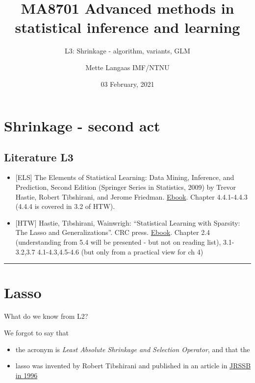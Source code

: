\documentclass[
]{article}
\title{MA8701 Advanced methods in statistical inference and learning}
\subtitle{L3: Shrinkage - algorithm, variants, GLM}
\author{Mette Langaas IMF/NTNU}
\date{03 February, 2021}
\providecommand{\tightlist}{%
  \setlength{\itemsep}{0pt}\setlength{\parskip}{0pt}}
\begin{document}
\maketitle

{
\setcounter{tocdepth}{2}
\tableofcontents
}
\hypertarget{shrinkage---second-act}{%
\section{Shrinkage - second act}\label{shrinkage---second-act}}

\hypertarget{literature-l3}{%
\subsection{Literature L3}\label{literature-l3}}

\begin{itemize}
\item
  {[}ELS{]} The Elements of Statistical Learning: Data Mining,
  Inference, and Prediction, Second Edition (Springer Series in
  Statistics, 2009) by Trevor Hastie, Robert Tibshirani, and Jerome
  Friedman.
  \href{https://web.stanford.edu/~hastie/Papers/ESLII.pdf}{Ebook}.
  Chapter 4.4.1-4.4.3 (4.4.4 is covered in 3.2 of HTW).
\item
  {[}HTW{]} Hastie, Tibshirani, Wainwrigh: ``Statistical Learning with
  Sparsity: The Lasso and Generalizations''. CRC press.
  \href{https://trevorhastie.github.io/}{Ebook}. Chapter 2.4
  (understanding from 5.4 will be presented - but not on reading list),
  3.1-3.2,3.7 4.1-4.3,4.5-4.6 (but only from a practical view for ch 4)
\end{itemize}

\begin{center}\rule{0.5\linewidth}{0.5pt}\end{center}

\hypertarget{lasso}{%
\section{Lasso}\label{lasso}}

What do we know from L2?

We forgot to say that

\begin{itemize}
\tightlist
\item
  the acronym is \emph{Least Absolute Shrinkage and Selection Operator},
  and that the
\item
  lasso was invented by Robert Tibshirani and published in an article in
  \href{https://www.jstor.org/stable/2346178?seq=1}{JRSSB in 1996}
\end{itemize}
\end{document}
